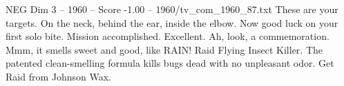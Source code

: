 \begin{textsample}{NEG Dim 3 – 1960 – Score -1.00 – 1960/tv\_com\_1960\_87.txt}  \label{ex:f3_neg_073}
These are your targets.
On the neck, behind the ear, inside the elbow.
Now good luck on your first solo bite.
Mission accomplished.
Excellent.
Ah, look, a commemoration.
Mmm, it smells sweet and good, like RAIN!
Raid Flying Insect Killer.
The patented clean-smelling formula kills bugs dead with no unpleasant odor.
Get Raid from Johnson Wax.

\end{textsample}
